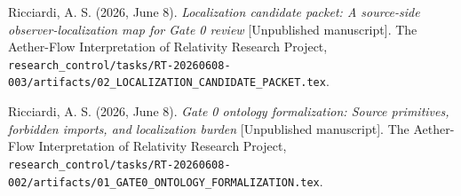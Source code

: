 \documentclass[11pt]{article}
\begin{document}
Ricciardi, A. S. (2026, June 8). \emph{Localization candidate packet: A
source-side observer-localization map for Gate 0 review} [Unpublished
manuscript]. The Aether-Flow Interpretation of Relativity Research Project,
\texttt{research\_control/tasks/RT-20260608-003/artifacts/02\_LOCALIZATION\_CANDIDATE\_PACKET.tex}.

Ricciardi, A. S. (2026, June 8). \emph{Gate 0 ontology formalization: Source
primitives, forbidden imports, and localization burden} [Unpublished
manuscript]. The Aether-Flow Interpretation of Relativity Research Project,
\texttt{research\_control/tasks/RT-20260608-002/artifacts/01\_GATE0\_ONTOLOGY\_FORMALIZATION.tex}.
\end{document}
